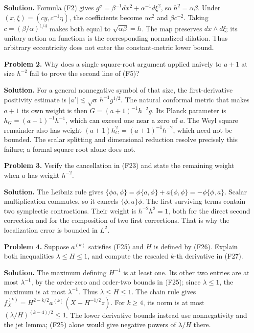 \documentclass[
  11pt,
]{article}
\begin{document}
\textbf{Solution.} Formula (F2) gives
\(g^\sigma=\beta^{-1}dx^2+\alpha^{-1}d\xi^2\), so \(h^2=\alpha\beta\).
Under \((x,\xi)=(cy,c^{-1}\eta)\), the coefficients become
\(\alpha c^2\) and \(\beta c^{-2}\). Taking \(c=(\beta/\alpha)^{1/4}\)
makes both equal to \(\sqrt{\alpha\beta}=h\). The map preserves
\(dx\wedge d\xi\); its unitary action on functions is the corresponding
normalized dilation. Thus arbitrary eccentricity does not enter the
constant-metric lower bound.

\textbf{Problem 2.} Why does a single square-root argument applied
naively to \(a+1\) at size \(h^{-2}\) fail to prove the second line of
(F5)?

\textbf{Solution.} For a general nonnegative symbol of that size, the
first-derivative positivity estimate is
\(|a'|\lesssim\sqrt{a}\,h^{-1}g^{1/2}\). The natural conformal metric
that makes \(a+1\) its own weight is then \(G=(a+1)^{-1}h^{-2}g\). Its
Planck parameter is \(h_G=(a+1)^{-1}h^{-1}\), which can exceed one near
a zero of \(a\). The Weyl square remainder also has weight
\((a+1)h_G^2=(a+1)^{-1}h^{-2}\), which need not be bounded. The scalar
splitting and dimensional reduction resolve precisely this failure; a
formal square root alone does not.

\textbf{Problem 3.} Verify the cancellation in (F23) and state the
remaining weight when \(a\) has weight \(h^{-2}\).

\textbf{Solution.} The Leibniz rule gives
\(\{\phi a,\phi\}=\phi\{a,\phi\}+a\{\phi,\phi\}=-\phi\{\phi,a\}\).
Scalar multiplication commutes, so it cancels \(\{\phi,a\}\phi\). The
first surviving terms contain two symplectic contractions. Their weight
is \(h^{-2}h^2=1\), both for the direct second correction and for the
composition of two first corrections. That is why the localization error
is bounded in \(L^2\).

\textbf{Problem 4.} Suppose \(a^{(k)}\) satisfies (F25) and \(H\) is
defined by (F26). Explain both inequalities \(\lambda\leq H\leq1\), and
compute the rescaled \(k\)-th derivative in (F27).

\textbf{Solution.} The maximum defining \(H^{-1}\) is at least one. Its
other two entries are at most \(\lambda^{-1}\), by the order-zero and
order-two bounds in (F25); since \(\lambda\leq1\), the maximum is at
most \(\lambda^{-1}\). Thus \(\lambda\leq H\leq1\). The chain rule gives
\(f_X^{(k)}=H^{2-k/2}a^{(k)}(X+H^{-1/2}z)\). For \(k\geq4\), its norm is
at most \((\lambda/H)^{(k-4)/2}\leq1\). The lower derivative bounds
instead use nonnegativity and the jet lemma; (F25) alone would give
negative powers of \(\lambda/H\) there.
\end{document}
